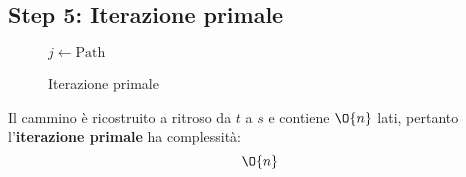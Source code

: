 \documentclass[\main/main.tex]{subfiles}
\begin{document}
\clearpage
\subsection{Step 5: Iterazione primale}
\begin{figure}
	\begin{algorithm}[H]
		\SetAlgoLined
		\(j\leftarrow \text{Path}\)\;
		\caption{Iterazione primale}
	\end{algorithm}
\end{figure}
\begin{complexity}
	Il cammino è ricostruito a ritroso da \(t\) a \(s\) e contiene \(\O{n}\) lati, pertanto l'\textbf{iterazione primale} ha complessità:
	\[
		\O{n}
	\]
\end{complexity}
\end{document}

